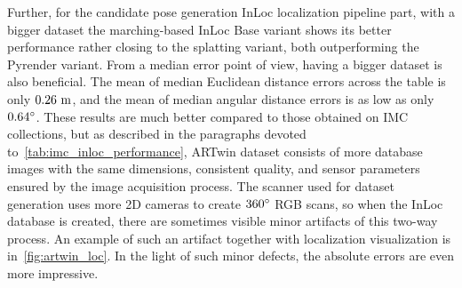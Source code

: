Further, for the candidate pose generation InLoc localization
pipeline part, with a bigger dataset the marching-based InLoc Base variant
shows its better performance rather closing to the splatting variant, both
outperforming the Pyrender variant. From a median error point of view,
having a bigger dataset is also beneficial. The mean of median Euclidean
distance errors across the table is only $0.26~\mathrm{m}$, and the mean of median
angular distance errors is as low as only $0.64^{\circ}$. These results
are much better compared to those obtained on IMC collections, but as
described in the paragraphs devoted to~\cref{tab:imc_inloc_performance},
ARTwin dataset consists of more database images with the same dimensions,
consistent quality, and sensor parameters ensured by the image acquisition
process. The scanner used for dataset generation uses more  2D
cameras to create $360^{\circ}$ RGB scans, so when the InLoc database is created,
there are sometimes visible minor artifacts of this two-way process. An example
of such an artifact together with localization visualization is
in~\cref{fig:artwin_loc}. In the light of such minor defects, the absolute
errors are even more impressive.


